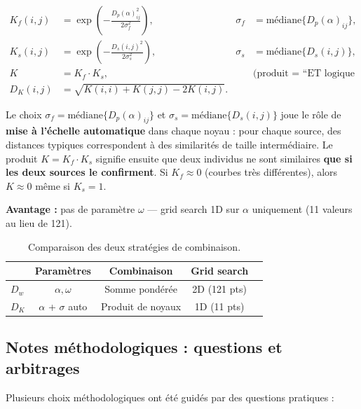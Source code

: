 \documentclass[11pt, a4paper]{article}
\newcommand{\Dp}{D_p}
\newcommand{\Dw}{D_w}
\newcommand{\DK}{D_K}
\begin{document}
\begin{align}
  K_f(i,j) &= \exp\!\left( -\frac{\Dp(\alpha)_{ij}^2}{2\sigma_f^2} \right),
  & \sigma_f &= \text{médiane}\{\Dp(\alpha)_{ij}\},  \\[4pt]
  K_s(i,j) &= \exp\!\left( -\frac{D_s(i,j)^2}{2\sigma_s^2} \right),
  & \sigma_s &= \text{médiane}\{D_s(i,j)\},  \\[4pt]
  K &= K_f \cdot K_s, & & \text{(produit = ``ET logique flou'')} \\[4pt]
  \DK(i,j) &= \sqrt{K(i,i) + K(j,j) - 2K(i,j)}.
\end{align}

Le choix $\sigma_f = \text{médiane}\{\Dp(\alpha)_{ij}\}$ et
$\sigma_s = \text{médiane}\{D_s(i,j)\}$ joue le rôle de
\textbf{mise à l'échelle automatique} dans chaque noyau : pour chaque
source, des distances typiques correspondent à des similarités de taille
intermédiaire. Le produit $K = K_f \cdot K_s$ signifie ensuite que deux
individus ne sont similaires \textbf{que si les deux sources le
confirment}. Si $K_f \approx 0$ (courbes très différentes), alors
$K \approx 0$ même si $K_s = 1$.

\textbf{Avantage :} pas de paramètre $\omega$ — grid search 1D sur $\alpha$
uniquement (11 valeurs au lieu de 121).

\begin{table}[H]
\centering
\begin{tabular}{lcccc}
  \toprule
  & \textbf{Paramètres} & \textbf{Combinaison} & \textbf{Grid search} \\
  \midrule
  $\Dw$ & $\alpha, \omega$ & Somme pondérée & 2D (121 pts) \\
  $\DK$ & $\alpha$ + $\sigma$ auto & Produit de noyaux & 1D (11 pts) \\
  \bottomrule
\end{tabular}
\caption{Comparaison des deux stratégies de combinaison.}
\end{table}

\subsection{Notes méthodologiques : questions et arbitrages}

Plusieurs choix méthodologiques ont été guidés par des questions
pratiques :
\end{document}
